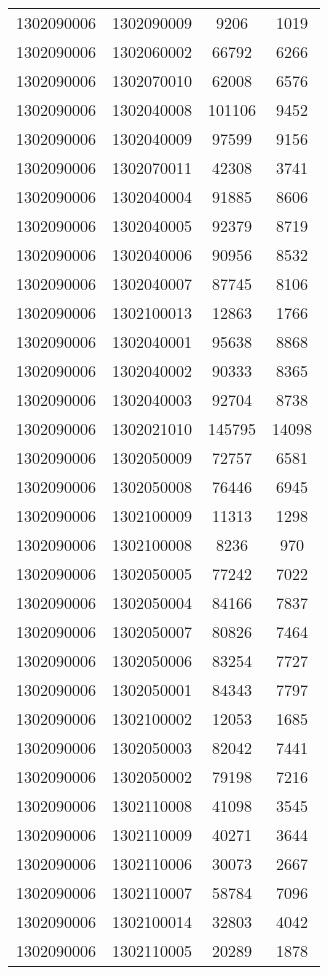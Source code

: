 \begin{longtable}{llcc}
1302090006 & 1302090009 & 9206 & 1019\\
1302090006 & 1302060002 & 66792 & 6266\\
1302090006 & 1302070010 & 62008 & 6576\\
1302090006 & 1302040008 & 101106 & 9452\\
1302090006 & 1302040009 & 97599 & 9156\\
1302090006 & 1302070011 & 42308 & 3741\\
1302090006 & 1302040004 & 91885 & 8606\\
1302090006 & 1302040005 & 92379 & 8719\\
1302090006 & 1302040006 & 90956 & 8532\\
1302090006 & 1302040007 & 87745 & 8106\\
1302090006 & 1302100013 & 12863 & 1766\\
1302090006 & 1302040001 & 95638 & 8868\\
1302090006 & 1302040002 & 90333 & 8365\\
1302090006 & 1302040003 & 92704 & 8738\\
1302090006 & 1302021010 & 145795 & 14098\\
1302090006 & 1302050009 & 72757 & 6581\\
1302090006 & 1302050008 & 76446 & 6945\\
1302090006 & 1302100009 & 11313 & 1298\\
1302090006 & 1302100008 & 8236 & 970\\
1302090006 & 1302050005 & 77242 & 7022\\
1302090006 & 1302050004 & 84166 & 7837\\
1302090006 & 1302050007 & 80826 & 7464\\
1302090006 & 1302050006 & 83254 & 7727\\
1302090006 & 1302050001 & 84343 & 7797\\
1302090006 & 1302100002 & 12053 & 1685\\
1302090006 & 1302050003 & 82042 & 7441\\
1302090006 & 1302050002 & 79198 & 7216\\
1302090006 & 1302110008 & 41098 & 3545\\
1302090006 & 1302110009 & 40271 & 3644\\
1302090006 & 1302110006 & 30073 & 2667\\
1302090006 & 1302110007 & 58784 & 7096\\
1302090006 & 1302100014 & 32803 & 4042\\
1302090006 & 1302110005 & 20289 & 1878\\

\end{longtable}
